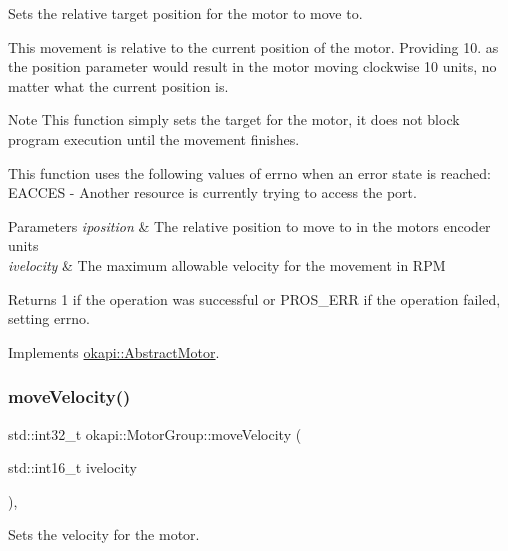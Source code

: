 Sets the relative target position for the motor to move to.

This movement is relative to the current position of the motor. Providing 10. as the position parameter would result in the motor moving clockwise 10 units, no matter what the current position is.

\begin{DoxyNote}{Note}
This function simply sets the target for the motor, it does not block program execution until the movement finishes.
\end{DoxyNote}
This function uses the following values of errno when an error state is reached\+: E\+A\+C\+C\+ES -\/ Another resource is currently trying to access the port.


\begin{DoxyParams}{Parameters}
{\em iposition} & The relative position to move to in the motor\textquotesingle{}s encoder units \\
\hline
{\em ivelocity} & The maximum allowable velocity for the movement in R\+PM \\
\hline
\end{DoxyParams}
\begin{DoxyReturn}{Returns}
1 if the operation was successful or P\+R\+O\+S\+\_\+\+E\+RR if the operation failed, setting errno. 
\end{DoxyReturn}


Implements \mbox{\hyperlink{classokapi_1_1AbstractMotor_a5a65d70a30f536593326cb754700e240}{okapi\+::\+Abstract\+Motor}}.

\mbox{\label{classokapi_1_1MotorGroup_a9f31c14e92efe7ab492b2c335c51b488}} 
\subsubsection{\texorpdfstring{moveVelocity()}{moveVelocity()}}
{\footnotesize\ttfamily std\+::int32\+\_\+t okapi\+::\+Motor\+Group\+::move\+Velocity (\begin{DoxyParamCaption}\item[{std\+::int16\+\_\+t}]{ivelocity }\end{DoxyParamCaption})\hspace{0.3cm}{\ttfamily [override]}, {\ttfamily [virtual]}}

Sets the velocity for the motor.


